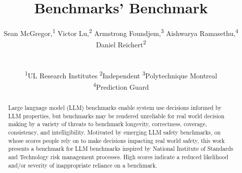 \documentclass{article}
\title{Benchmarks' Benchmark}
\author{%
  Sean McGregor,\textsuperscript{1}
  Victor Lu,\textsuperscript{2}
  Armstrong Foundjem,\textsuperscript{3}
  Aishwarya Ramasethu,\textsuperscript{4}
  Daniel Reichert\textsuperscript{2} \\
   \\
  \\
  \textsuperscript{1}UL Research Institutes \textsuperscript{2}Independent
\textsuperscript{3}Polytechnique Montreal
\\
\textsuperscript{4}Prediction Guard
}
\begin{document}
\maketitle

\begin{abstract}
Large language model (LLM) benchmarks enable system use decisions informed by LLM properties, but benchmarks may be rendered unreliable for real world decision making by a variety of threats to benchmark longevity, correctness, coverage, consistency, and intelligibility. Motivated by emerging LLM safety benchmarks, on whose scores people rely on to make decisions impacting real world safety, this work presents a benchmark for LLM benchmarks inspired by National Institute of Standards and Technology risk management processes. High scores indicate a reduced likelihood and/or severity of inappropriate reliance on a benchmark.
\end{abstract}






% 
\end{document}
